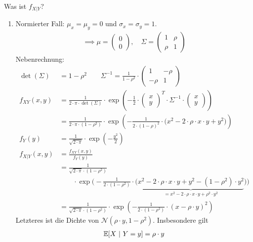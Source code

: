 \begin{beisp}
	Was ist $f_{X|Y}$?
	\begin{enumerate}
		\item Normierter Fall: $\mu_x=\mu_y=0$ und $\sigma_x=\sigma_y=1$.
		\begin{align*}
			\implies \mu=\begin{pmatrix}
				0\\ 0
			\end{pmatrix},\quad\Sigma=\begin{pmatrix}
				1 & \rho\\
				\rho & 1
			\end{pmatrix}
		\end{align*}
		Nebenrechnung:
		\begin{align*}
			\det(\Sigma)&=1-\rho^2\qquad\Sigma^{-1}=\frac{1}{1-\rho^2}\cdot\begin{pmatrix}
				1 & -\rho\\
				-\rho & 1
			\end{pmatrix}\\
			f_{XY}(x,y)&=\frac{1}{2\cdot\pi\cdot\det(\Sigma)}\cdot\exp\left(-\frac{1}{2}\cdot\begin{pmatrix}
				x\\ y
			\end{pmatrix}^T\cdot\Sigma^{-1}\cdot\begin{pmatrix}
				x\\ y
			\end{pmatrix}\right)\\
			&=\frac{1}{2\cdot\pi\cdot(1-\rho^2)}\cdot\exp\left(-\frac{1}{2\cdot(1-\rho)^2}\cdot\big(x^2-2\cdot\rho\cdot x\cdot y+y^2\big)\right)\\
			f_Y(y) &=\frac{1}{\sqrt{2\cdot\pi}}\cdot\exp\left(-\frac{y^2}{2}\right)\\
			f_{X|Y}(x,y)&=\frac{f_{XY}(x,y)}{f_Y(y)}\\
			&=\frac{1}{\sqrt{2\cdot\pi}\cdot(1-\rho^2)}\\
			&\qquad\cdot\exp\Bigg(-\frac{1}{2\cdot(1-\rho^2)}\cdot\big(\underbrace{x^2-2\cdot\rho\cdot x\cdot y+y^2-(1-\rho^2)\cdot y^2}_{=x^2-2\cdot\rho	\cdot x\cdot y+\rho^2\cdot y^2}\big)\Bigg)\\
			&=\frac{1}{\sqrt{2\cdot\pi}\cdot(1-\rho^2)}\cdot\exp\left(-\frac{1}{2\cdot(1-\rho^2)}\cdot(x-\rho\cdot y)^2\right)
		\end{align*}
		Letzteres ist die Dichte von $\mathcal{N}(\rho\cdot y,1-\rho^2)$. Insbesondere gilt
		\begin{align*}
			\E[X~|~Y=y]&=\rho\cdot y\\

\end{align*}
\end{enumerate}
\end{beisp}
